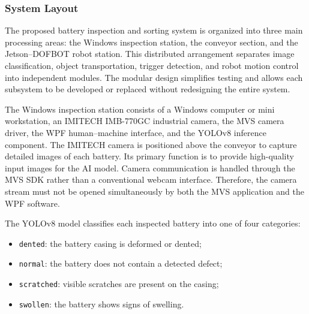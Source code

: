 % 
%

\subsubsection{System Layout}
\label{sec:system-layout}

The proposed battery inspection and sorting system is organized into three main processing areas: the Windows inspection station, the conveyor section, and the Jetson--DOFBOT robot station. This distributed arrangement separates image classification, object transportation, trigger detection, and robot motion control into independent modules. The modular design simplifies testing and allows each subsystem to be developed or replaced without redesigning the entire system.

The Windows inspection station consists of a Windows computer or mini workstation, an IMITECH IMB-770GC industrial camera, the MVS camera driver, the WPF human--machine interface, and the YOLOv8 inference component. The IMITECH camera is positioned above the conveyor to capture detailed images of each battery. Its primary function is to provide high-quality input images for the AI model. Camera communication is handled through the MVS SDK rather than a conventional webcam interface. Therefore, the camera stream must not be opened simultaneously by both the MVS application and the WPF software.

The YOLOv8 model classifies each inspected battery into one of four categories:

\begin{itemize}
    \item \texttt{dented}: the battery casing is deformed or dented;
    \item \texttt{normal}: the battery does not contain a detected defect;
    \item \texttt{scratched}: visible scratches are present on the casing;
    \item \texttt{swollen}: the battery shows signs of swelling.
\end{itemize}

